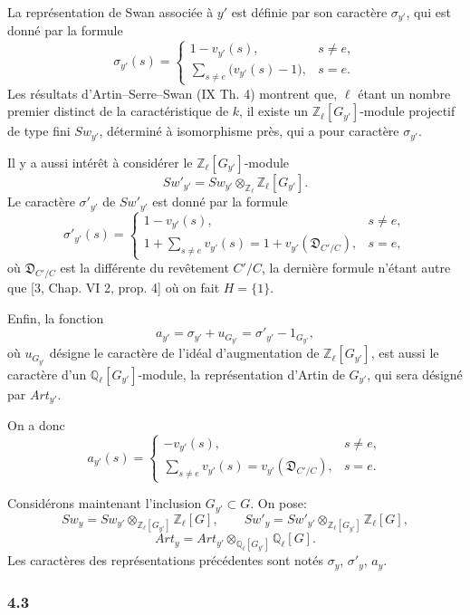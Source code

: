 \documentclass[11pt]{article}
\begin{document}
La représentation de Swan associée à $y'$ est définie par son caractère $\sigma_{y'}$, qui est donné par la formule
\[
\sigma_{y'}(s)=
\begin{cases}
1-v_{y'}(s),& s\ne e,\\[0.4em]
\displaystyle\sum_{s\ne e}\bigl(v_{y'}(s)-1\bigr),& s=e.
\end{cases}
\tag{4.2.2}
\]
Les résultats d'Artin--Serre--Swan (IX Th. 4) montrent que, $\ell$ étant un nombre premier distinct de la caractéristique de $k$, il existe un $\mathbb Z_\ell[G_{y'}]$-module projectif de type fini $Sw_{y'}$, déterminé à isomorphisme près, qui a pour caractère $\sigma_{y'}$.

Il y a aussi intérêt à considérer le $\mathbb Z_\ell[G_{y'}]$-module
\[
Sw'_{y'}=Sw_{y'}\otimes_{\mathbb Z_\ell}\mathbb Z_\ell[G_{y'}].
\tag{4.2.3}
\]
Le caractère $\sigma'_{y'}$ de $Sw'_{y'}$ est donné par la formule
\[
\sigma'_{y'}(s)=
\begin{cases}
1-v_{y'}(s),& s\ne e,\\[0.4em]
\displaystyle 1+\sum_{s\ne e}v_{y'}(s)
=1+v_{y'}(\mathfrak D_{C'/C}),& s=e,
\end{cases}
\tag{4.2.4}
\]
où $\mathfrak D_{C'/C}$ est la différente du revêtement $C'/C$, la dernière formule n'étant autre que [3, Chap. VI 2, prop. 4] où on fait $H=\{1\}$.

Enfin, la fonction
\[
a_{y'}=\sigma_{y'}+u_{G_{y'}}=\sigma'_{y'}-1_{G_{y'}},
\tag{4.2.5}
\]
où $u_{G_{y'}}$ désigne le caractère de l'idéal d'augmentation de $\mathbb Z_\ell[G_{y'}]$, est aussi le caractère d'un $\mathbb Q_\ell[G_{y'}]$-module, la représentation d'Artin de $G_{y'}$, qui sera désigné par $Art_{y'}$.

On a donc
\[
a_{y'}(s)=
\begin{cases}
-v_{y'}(s),& s\ne e,\\[0.4em]
\displaystyle\sum_{s\ne e}v_{y'}(s)=v_{y'}(\mathfrak D_{C'/C}),& s=e.
\end{cases}
\tag{4.2.6}
\]

Considérons maintenant l'inclusion $G_{y'}\subset G$. On pose:
\[
Sw_y=Sw_{y'}\otimes_{\mathbb Z_\ell[G_{y'}]}\mathbb Z_\ell[G],
\qquad
Sw'_y=Sw'_{y'}\otimes_{\mathbb Z_\ell[G_{y'}]}\mathbb Z_\ell[G],
\tag{4.2.7}
\]
\[
Art_y=Art_{y'}\otimes_{\mathbb Q_\ell[G_{y'}]}\mathbb Q_\ell[G].
\tag{4.2.8}
\]
Les caractères des représentations précédentes sont notés $\sigma_y$, $\sigma'_y$, $a_y$.

\subsubsection*{4.3}
\end{document}
